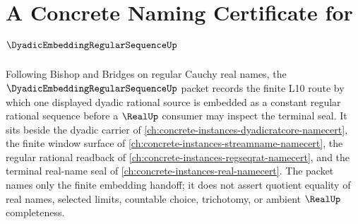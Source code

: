\chapter{A Concrete Naming Certificate for $\DyadicEmbeddingRegularSequenceUp$}
\label{ch:concrete-instances-dyadic-embedding-regular-sequence-namecert}

Following Bishop and Bridges on regular Cauchy real names, the $\DyadicEmbeddingRegularSequenceUp$ packet records the finite L10 route by which one displayed dyadic rational source is embedded as a constant regular rational sequence before a $\RealUp$ consumer may inspect the terminal seal. It sits beside the dyadic carrier of \autoref{ch:concrete-instances-dyadicratcore-namecert}, the finite window surface of \autoref{ch:concrete-instances-streamname-namecert}, the regular rational readback of \autoref{ch:concrete-instances-regseqrat-namecert}, and the terminal real-name seal of \autoref{ch:concrete-instances-real-namecert}. The packet names only the finite embedding handoff; it does not assert quotient equality of real names, selected limits, countable choice, trichotomy, or ambient $\RealUp$ completeness.

